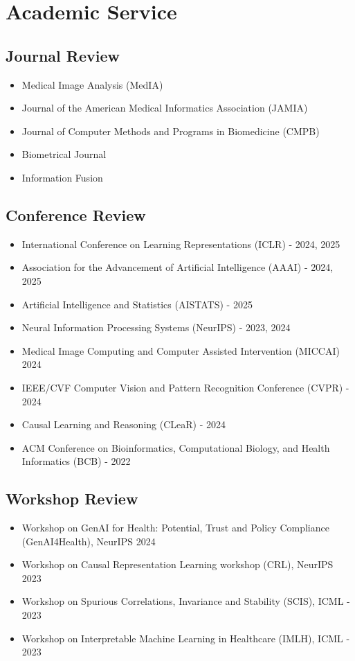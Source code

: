 \section{ Academic Service }
\subsection{Journal Review}
\begin{itemize}[itemsep=0pt, parsep=0pt]
\item Medical Image Analysis (MedIA)
\item Journal of the American Medical Informatics Association (JAMIA)
\item{Journal of Computer Methods and Programs in Biomedicine (CMPB)}
\item {Biometrical Journal}
\item {Information Fusion}
\end{itemize}

\subsection{Conference Review}
\begin{itemize}[itemsep=0pt, parsep=0pt]
\item International Conference on Learning Representations (ICLR) - 2024, 2025
\item Association for the Advancement of Artificial Intelligence (AAAI) - 2024, 2025
\item Artificial Intelligence and Statistics (AISTATS) - 2025
\item{Neural Information Processing Systems (NeurIPS) - 2023, 2024}
\item Medical Image Computing and Computer Assisted Intervention (MICCAI) 2024
\item IEEE/CVF Computer Vision and Pattern Recognition Conference (CVPR) - 2024
\item Causal Learning and Reasoning (CLeaR) - 2024
\item ACM Conference on Bioinformatics, Computational Biology, and Health Informatics (BCB) - 2022
\end{itemize}

\subsection{Workshop Review}
\begin{itemize}[itemsep=0pt, parsep=0pt]
\item{Workshop on GenAI for Health: Potential, Trust and Policy Compliance (GenAI4Health), NeurIPS 2024}
\item{Workshop on Causal Representation Learning workshop (CRL), NeurIPS 2023}
\item{Workshop on Spurious Correlations, Invariance and Stability (SCIS), ICML - 2023}
\item{Workshop on Interpretable Machine Learning in Healthcare (IMLH), ICML - 2023}

\end{itemize}
